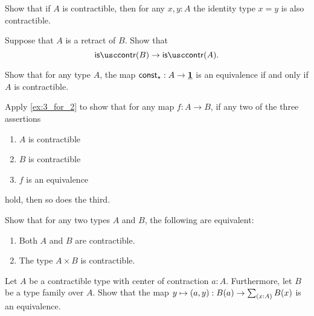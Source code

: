 \begin{exercises}
\item \label{ex:prop_contr}Show that if $A$ is contractible, then for any $x,y:A$ the identity type $x=y$ is also contractible.
\item \label{ex:contr_retr}Suppose that $A$ is a retract of $B$. Show that
  \begin{equation*}
    \iscontr(B)\to\iscontr(A).
  \end{equation*}
\item \label{ex:contr_equiv}
  \begin{subexenum}
  \item Show that for any type $A$, the map $\mathsf{const}_\star : A\to \underline{\mathbf{1}}$ is an equivalence if and only if $A$ is contractible.
  \item Apply \cref{ex:3_for_2} to show that for any map $f:A\to B$, if any two of the three assertions
    \begin{enumerate}
    \item $A$ is contractible
    \item $B$ is contractible
    \item $f$ is an equivalence
    \end{enumerate}
    hold, then so does the third.
  \end{subexenum}
\item Show that for any two types $A$ and $B$, the following are equivalent:
  \begin{enumerate}
  \item Both $A$ and $B$ are contractible.
  \item The type $A\times B$ is contractible.
  \end{enumerate}
\item \label{ex:contr_in_sigma} Let $A$ be a contractible type with center of contraction $a:A$. Furthermore, let $B$ be a type family over $A$. Show that the map $y\mapsto\pairr{a,y}:B(a)\to\sm{x:A}B(x)$ is an equivalence.

\end{exercises}
